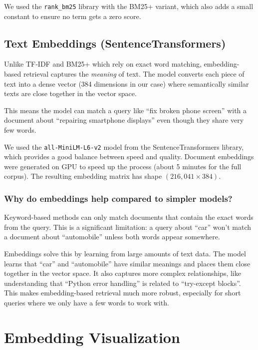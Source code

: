 \documentclass[12pt,a4paper]{article}
\begin{document}
We used the \texttt{rank\_bm25} library with the BM25+ variant, which also adds a small constant to ensure no term gets a zero score.

\subsection{Text Embeddings (SentenceTransformers)}

Unlike TF-IDF and BM25+ which rely on exact word matching, embedding-based retrieval captures the \textit{meaning} of text. The model converts each piece of text into a dense vector (384 dimensions in our case) where semantically similar texts are close together in the vector space.

This means the model can match a query like ``fix broken phone screen'' with a document about ``repairing smartphone displays'' even though they share very few words.

We used the \texttt{all-MiniLM-L6-v2} model from the SentenceTransformers library, which provides a good balance between speed and quality. Document embeddings were generated on GPU to speed up the process (about 5 minutes for the full corpus). The resulting embedding matrix has shape $(216{,}041 \times 384)$.

\subsubsection{Why do embeddings help compared to simpler models?}

Keyword-based methods can only match documents that contain the exact words from the query. This is a significant limitation: a query about ``car'' won't match a document about ``automobile'' unless both words appear somewhere.

Embeddings solve this by learning from large amounts of text data. The model learns that ``car'' and ``automobile'' have similar meanings and places them close together in the vector space. It also captures more complex relationships, like understanding that ``Python error handling'' is related to ``try-except blocks''. This makes embedding-based retrieval much more robust, especially for short queries where we only have a few words to work with.

\section{Embedding Visualization}
\end{document}
